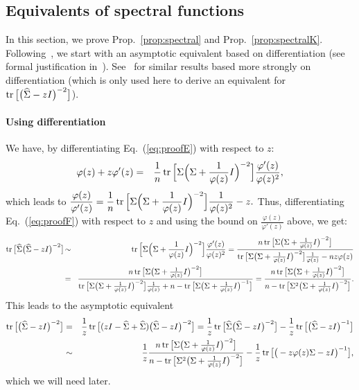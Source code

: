 \documentclass[11pt]{article}
\newcommand{\BEAS}{\begin{eqnarray*}}
\newcommand{\EEAS}{\end{eqnarray*}}
\newcommand{\BEA}{\begin{eqnarray}}
\newcommand{\EEA}{\end{eqnarray}}
\newcommand{\tr}{\mathop{ \rm tr}}
\newcommand{\idm}{I}
\newcommand{\ds}{\displaystyle }
\newcommand{\eq}[1]{Eq.~(\ref{eq:#1})}
\def \hS{ \widehat{ \Sigma} }
\def \S{  { \Sigma} }
\begin{document}
\subsection{Equivalents of spectral functions}
\label{app:spectraltrace}


In this section, we prove Prop.~\ref{prop:spectral} and  Prop.~\ref{prop:spectralK}. Following~\cite{dobriban2018high}, we start with an asymptotic equivalent based on differentiation (see formal justification in~\cite{dobriban2018high}).
See~\cite{dar2021common,lejeune2022asymptotics} for similar results based more strongly on differentiation (which is only used here to derive an equivalent for $ \tr\big[   \big(   \hS - z\idm \big)^{-2} \big] $).

\paragraph{Using differentiation}
We have, by differentiating \eq{proofE} with respect to $z$:
\BEAS
\varphi(z) + z \varphi'(z)
& = & \frac{1}{n} \tr\Big[  \S \Big(  \S +  \frac{1}{\varphi(z)} \idm \Big)^{-2} \Big] \frac{ \varphi'(z)}{\varphi(z)^2},
\EEAS
which leads to
$\ds 
\frac{\varphi(z)}{\varphi'(z)}
= \frac{1}{n} \tr\Big[  \S \Big(  \S +  \frac{1}{\varphi(z)} \idm \Big)^{-2} \Big] \frac{ 1}{\varphi(z)^2} - z.
$
Thus,  differentiating \eq{proofF} with respect to $z$ and using the bound on $\frac{\varphi(z)}{\varphi'(z)}$ above, we get:
\BEAS
\tr\big[  \hS \big(   \hS - z\idm \big)^{-2} \big] 
&\! \sim \! &  \tr\Big[  \S \Big(  \S +  \frac{1}{\varphi(z)} \idm \Big)^{-2} \Big] \frac{ \varphi'(z)}{\varphi(z)^2}
=   \frac{  n \tr\big[  \S \big(  \S +  \frac{1}{\varphi(z)} \idm \big)^{-2} \big]}
{    \tr\big[  \S \big(  \S +  \frac{1}{\varphi(z)} \idm \big)^{-2} \big] \frac{ 1}{\varphi(z)}  - nz \varphi(z)   } 
\\
&\! = \!& \frac{ n \tr\big[  \S \big(  \S +  \frac{1}{\varphi(z)} \idm \big)^{-2} \big]}
{  \tr\big[  \S \big(  \S +  \frac{1}{\varphi(z)} \idm \big)^{-2} \big] \frac{ 1}{\varphi(z)}
 + n - \tr\big[  \S \big(  \S +  \frac{1}{\varphi(z)} \idm \big)^{-1} \big]   } = \frac{ n \tr\big[  \S \big(  \S +  \frac{1}{\varphi(z)} \idm \big)^{-2} \big]}
{    n -  \tr\big[  \S^2 \big(  \S +  \frac{1}{\varphi(z)} \idm \big)^{-2} \big] } .
\EEAS
This leads to the asymptotic equivalent
\BEA
\notag \tr\big[   \big(   \hS - z\idm \big)^{-2} \big] 
& = & \frac{1}{z} \tr\big[  (z \idm - \hS + \hS) \big(   \hS - z\idm \big)^{-2} \big] 
= \frac{1}{z} \tr\big[   \hS  \big(   \hS - z\idm \big)^{-2} \big]  
-  \frac{1}{z} \tr\big[  \big(   \hS - z\idm \big)^{-1} \big]  \\
\label{eq:prdr}
& \sim & \frac{1}{z} 
\frac{   n\tr\big[  \S \big(  \S +  \frac{1}{\varphi(z)} \idm \big)^{-2} \big]}
{    n -  \tr\big[  \S^2 \big(  \S +  \frac{1}{\varphi(z)} \idm \big)^{-2} \big]} - \frac{1}{z} 
\tr \big[   \big( - z \varphi(z) \S - z \idm \big)^{-1} \big],
\EEA
which we will need later.
 
\end{document}
